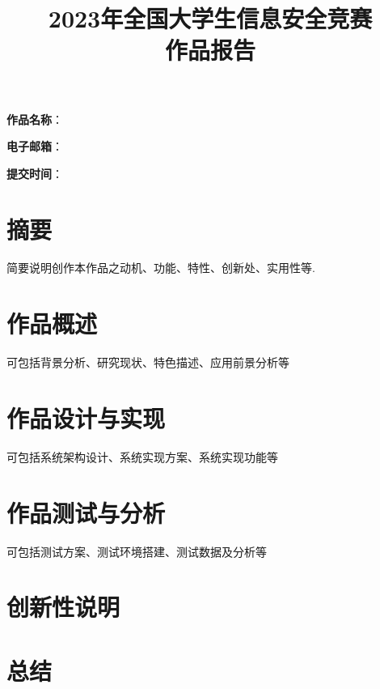 \documentclass[12pt,a4paper]{ctexart}
\date{}
\title{\Huge\textbf{2023年全国大学生信息安全竞赛\\作品报告}}
\begin{document}
\maketitle
\vspace{6cm}
{
    \Large\textbf{作品名称}：\textbf{\underline{}}

    \textbf{\underline{}}

    \textbf{电子邮箱}：\underline{}

    \textbf{提交时间}：\underline{\makebox[10cm]{\textbf{\today}}}
}
\thispagestyle{empty}
\clearpage

\thispagestyle{empty}
\clearpage
\tableofcontents
\thispagestyle{empty}
\clearpage
\setcounter{page}{1}
\section*{摘要}
简要说明创作本作品之动机、功能、特性、创新处、实用性等.
\section{作品概述}
可包括背景分析、研究现状、特色描述、应用前景分析等
\section{作品设计与实现}
可包括系统架构设计、系统实现方案、系统实现功能等
\section{作品测试与分析}
可包括测试方案、测试环境搭建、测试数据及分析等
\section{创新性说明}
\section{总结}
\end{document}

